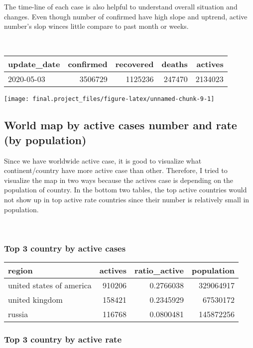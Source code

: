 \documentclass[
  11pt,
]{article}
\begin{document}
The time-line of each case is also helpful to understand overall
situation and changes. Even though number of confirmed have high slope
and uptrend, active number's slop winces little compare to past month or
weeks.

~

\begin{longtable}[]{@{}lrrrr@{}}
\toprule
update\_date & confirmed & recovered & deaths & actives\tabularnewline
\midrule
\endhead
2020-05-03 & 3506729 & 1125236 & 247470 & 2134023\tabularnewline
\bottomrule
\end{longtable}

\begin{center}\texttt{[image: final.project\_files/figure-latex/unnamed-chunk-9-1]} \end{center}

\hypertarget{world-map-by-active-cases-number-and-rate-by-population}{%
\subsection{World map by active cases number and rate (by
population)}\label{world-map-by-active-cases-number-and-rate-by-population}}

Since we have worldwide active case, it is good to visualize what
continent/country have more active case than other. Therefore, I tried
to visualize the map in two ways because the actives case is depending
on the population of country. In the bottom two tables, the top active
countries would not show up in top active rate countries since their
number is relatively small in population.

~

\hypertarget{top-3-country-by-active-cases}{%
\subsubsection{Top 3 country by active
cases}\label{top-3-country-by-active-cases}}

\begin{longtable}[]{@{}lrrr@{}}
\toprule
region & actives & ratio\_active & population\tabularnewline
\midrule
\endhead
united states of america & 910206 & 0.2766038 & 329064917\tabularnewline
united kingdom & 158421 & 0.2345929 & 67530172\tabularnewline
russia & 116768 & 0.0800481 & 145872256\tabularnewline
\bottomrule
\end{longtable}

\hypertarget{top-3-country-by-active-rate}{%
\subsubsection{Top 3 country by active
rate}\label{top-3-country-by-active-rate}}
\end{document}
